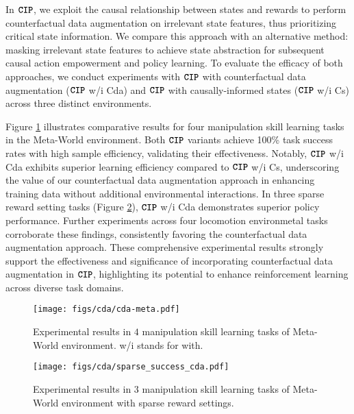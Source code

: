 In $\texttt{\textbf{CIP}}$, we exploit the causal relationship between states and rewards to perform counterfactual data augmentation on irrelevant state features, thus prioritizing critical state information. We compare this approach with an alternative method: masking irrelevant state features to achieve state abstraction for subsequent causal action empowerment and policy learning. To evaluate the efficacy of both approaches, we conduct experiments with $\texttt{\textbf{CIP}}$ with counterfactual data augmentation ($\texttt{\textbf{CIP}}$ w/i Cda) and $\texttt{\textbf{CIP}}$ with causally-informed states ($\texttt{\textbf{CIP}}$ w/i Cs) across three distinct environments.

Figure \ref{fig:cda_meta} illustrates comparative results for four manipulation skill learning tasks in the Meta-World environment. Both $\texttt{\textbf{CIP}}$ variants achieve 100\% task success rates with high sample efficiency, validating their effectiveness. Notably, $\texttt{\textbf{CIP}}$ w/i Cda exhibits superior learning efficiency compared to $\texttt{\textbf{CIP}}$ w/i Cs, underscoring the value of our counterfactual data augmentation approach in enhancing training data without additional environmental interactions. 
In three sparse reward setting tasks (Figure \ref{fig:cda_sparse}), $\texttt{\textbf{CIP}}$ w/i Cda demonstrates superior policy performance. Further experiments across four locomotion environmetal tasks corroborate these findings, consistently favoring the counterfactual data augmentation approach.
These comprehensive experimental results strongly support the effectiveness and significance of incorporating counterfactual data augmentation in $\texttt{\textbf{CIP}}$, highlighting its potential to enhance reinforcement learning across diverse task domains.


\begin{figure}[t]
    \centering
    \texttt{[image: figs/cda/cda-meta.pdf]}
    \caption{Experimental results in $4$ manipulation skill learning tasks of Meta-World environment. w/i stands for with.}
    \label{fig:cda_meta}
\end{figure}

\begin{figure}[t]
    \centering
    \texttt{[image: figs/cda/sparse\_success\_cda.pdf]}
    \caption{Experimental results in $3$ manipulation skill learning tasks of Meta-World environment with sparse reward settings.}
    \label{fig:cda_sparse}
\end{figure}

